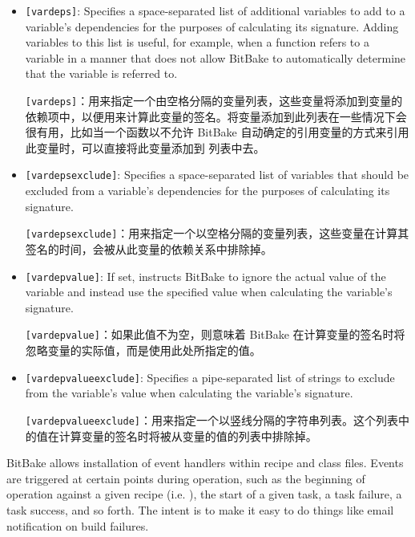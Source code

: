 \begin{itemize}
\setlength\itemsep{1.0em}
\item \texttt{[vardeps]}: Specifies a space-separated list of additional variables to add to a variable's dependencies for the purposes of calculating its signature. Adding variables to this list is useful, for example, when a function refers to a variable in a manner that does not allow BitBake to automatically determine that the variable is referred to.

\medskip
\texttt{[vardeps]}：用来指定一个由空格分隔的变量列表，这些变量将添加到变量的依赖项中，以便用来计算此变量的签名。将变量添加到此列表在一些情况下会很有用，比如当一个函数以不允许 BitBake 自动确定的引用变量的方式来引用此变量时，可以直接将此变量添加到  列表中去。

\item \texttt{[vardepsexclude]}: Specifies a space-separated list of variables that should be excluded from a variable's dependencies for the purposes of calculating its signature.

\medskip
\texttt{[vardepsexclude]}：用来指定一个以空格分隔的变量列表，这些变量在计算其签名的时间，会被从此变量的依赖关系中排除掉。

\item \texttt{[vardepvalue]}: If set, instructs BitBake to ignore the actual value of the variable and instead use the specified value when calculating the variable's signature.

\medskip
\texttt{[vardepvalue]}：如果此值不为空，则意味着 BitBake 在计算变量的签名时将忽略变量的实际值，而是使用此处所指定的值。

\item \texttt{[vardepvalueexclude]}: Specifies a pipe-separated list of strings to exclude from the variable's value when calculating the variable's signature.

\medskip
\texttt{[vardepvalueexclude]}：用来指定一个以竖线分隔的字符串列表。这个列表中的值在计算变量的签名时将被从变量的值的列表中排除掉。

\end{itemize}


BitBake allows installation of event handlers within recipe and class files. Events are triggered at certain points during operation, such as the beginning of operation against a given recipe (i.e. ), the start of a given task, a task failure, a task success, and so forth. The intent is to make it easy to do things like email notification on build failures.

